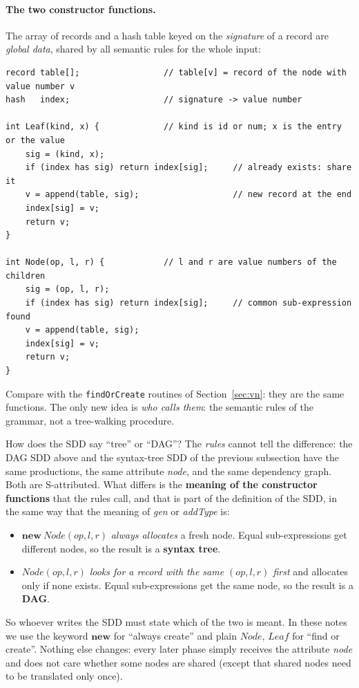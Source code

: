 \documentclass[11pt,a4paper]{article}
\begin{document}
\paragraph{The two constructor functions.} The array of records and a hash table keyed on the \emph{signature} of a record are \emph{global data}, shared by all semantic rules for the whole input:
\begin{lstlisting}
record table[];                 // table[v] = record of the node with value number v
hash   index;                   // signature -> value number

int Leaf(kind, x) {             // kind is id or num; x is the entry or the value
    sig = (kind, x);
    if (index has sig) return index[sig];     // already exists: share it
    v = append(table, sig);                   // new record at the end
    index[sig] = v;
    return v;
}

int Node(op, l, r) {            // l and r are value numbers of the children
    sig = (op, l, r);
    if (index has sig) return index[sig];     // common sub-expression found
    v = append(table, sig);
    index[sig] = v;
    return v;
}
\end{lstlisting}
Compare with the \texttt{findOrCreate} routines of Section~\ref{sec:vn}: they are the same functions. The only new idea is \emph{who calls them}: the semantic rules of the grammar, not a tree-walking procedure.


\begin{notebox}{How does the SDD say ``tree'' or ``DAG''?}
The \emph{rules} cannot tell the difference: the DAG SDD above and the syntax-tree SDD of the previous subsection have the same productions, the same attribute \textit{node}, and the same dependency graph. Both are S-attributed. What differs is the \textbf{meaning of the constructor functions} that the rules call, and that is part of the definition of the SDD, in the same way that the meaning of \textit{gen} or \textit{addType} is:
\begin{itemize}[nosep]
\item $\mathbf{new}\ \mathit{Node}(op,l,r)$ \emph{always allocates} a fresh node. Equal sub-expressions get different nodes, so the result is a \textbf{syntax tree}.
\item $\mathit{Node}(op,l,r)$ \emph{looks for a record with the same $(op,l,r)$ first} and allocates only if none exists. Equal sub-expressions get the same node, so the result is a \textbf{DAG}.
\end{itemize}
So whoever writes the SDD must state which of the two is meant. In these notes we use the keyword $\mathbf{new}$ for ``always create'' and plain $\mathit{Node}$, $\mathit{Leaf}$ for ``find or create''. Nothing else changes: every later phase simply receives the attribute \textit{node} and does not care whether some nodes are shared (except that shared nodes need to be translated only once).
\end{notebox}
\end{document}

